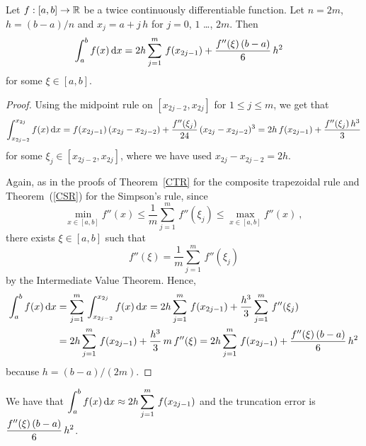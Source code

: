 \begin{theorem}
Let $f:[a,b]\rightarrow \mathbb{R}$ be a twice continuously
differentiable function.  Let $n=2m$, $h=(b-a)/n$ and
$x_j = a+j\,h$ for $j=0$, $1$ \ldots, $2m$.  Then
\begin{align*}
\int_{a}^{b} f(x)\,\mathrm{d}x &= 2h \sum_{j=1}^m\,f(x_{2j-1}) +
\frac{f''(\xi)\,(b-a)}{6}\,h^2
\end{align*}
for some $\xi \in [a,b]$.
\label{CMR}
\end{theorem}

\begin{proof}
Using the midpoint rule on $[x_{2j-2},x_{2j}]$ for $1\leq j \leq m$,
we get that
\[
\int_{x_{2j-2}}^{x_{2j}} f(x) \,\mathrm{d}x =
f(x_{2j-1})\left(x_{2j}-x_{2j-2}\right) +
\frac{f''(\xi_j)}{24}\,(x_{2j}-x_{2j-2})^3
= 2h\,f(x_{2j-1}) + \frac{f''(\xi_j)\,h^3}{3}
\]
for some $\xi_j \in [x_{2j-2},x_{2j}]$, where we have used
$x_{2j} -x_{2j-2} = 2h$.

Again, as in the proofs of Theorem~\ref{CTR} for the composite
trapezoidal rule and Theorem~(\ref{CSR}) for the Simpson's rule, since
\[
\min_{x\in [a,b]} f''(x) \leq
\frac{1}{m}\sum_{j=1}^m\,f''(\xi_j) \leq
\max_{x\in [a,b]} f''(x) \ ,
\]
there exists $\xi \in [a,b]$ such that
\[
f''(\xi) = \frac{1}{m}\sum_{j=1}^m\,f''(\xi_j)
\]
by the Intermediate Value Theorem.  Hence,
\begin{align*}
\int_a^b f(x) \,\mathrm{d}x &= \sum_{j=1}^m\,
 \int_{x_{2j-2}}^{x_{2j}} f(x)\,\mathrm{d}x
= 2h \sum_{j=1}^m\,f(x_{2j-1}) + \frac{h^3}{3}
 \sum_{j=1}^m\,f''(\xi_j) \\
&= 2h \sum_{j=1}^m\,f(x_{2j-1}) +
\frac{h^3}{3}\,m\,f''(\xi)
= 2h \sum_{j=1}^m\,f(x_{2j-1}) + \frac{f''(\xi)\,(b-a)}{6}\,h^2
\end{align*}
because $h = (b-a)/(2m)$.
\end{proof}


\begin{rmk}
We have that
$\displaystyle \int_a^b f(x)\,\mathrm{d}x \approx
2h \sum_{j=1}^m\,f(x_{2j-1})$ and the truncation error is
$\displaystyle \frac{f''(\xi)\,(b-a)}{6}\,h^2$.
\end{rmk}

